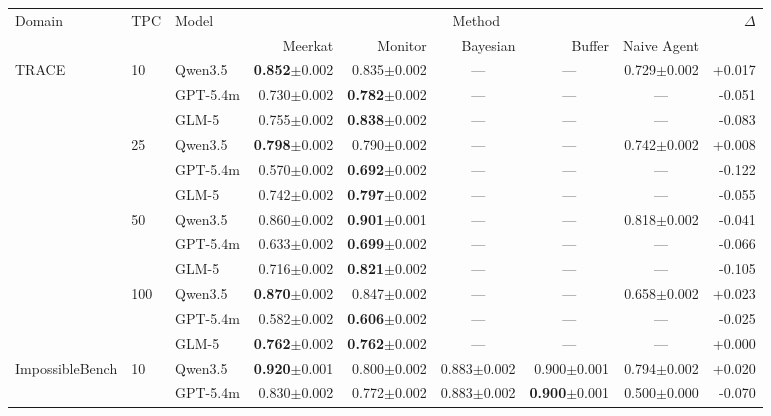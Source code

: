\documentclass{article} %
\newcommand{\res}[2]{#1{\scriptsize$\pm$#2}}
\newcommand{\bestres}[2]{\textbf{#1}{\scriptsize$\pm$#2}}
\newcommand{\na}{\multicolumn{1}{c}{---}}
\begin{document}
\begin{table}[t]
  \centering
  \tiny
  \begin{tabular}{@{}lllrrrrrr@{}}
    \toprule
    \multirow{2}{*}{Domain} & \multirow{2}{*}{TPC} & \multirow{2}{*}{Model}
      & \multicolumn{5}{c}{Method} & \multirow{2}{*}{$\Delta$} \\
    \cmidrule(lr){4-8}
      & & & Meerkat & Monitor & Bayesian & Buffer & Naive Agent & \\
    \midrule
    \multirow{12}{*}{TRACE} & \multirow{3}{*}{10} & Qwen3.5 & \bestres{0.852}{0.002} & \res{0.835}{0.002} & \na & \na & \res{0.729}{0.002} & +0.017 \\
     & & GPT-5.4m & \res{0.730}{0.002} & \bestres{0.782}{0.002} & \na & \na & \na & -0.051 \\
     & & GLM-5 & \res{0.755}{0.002} & \bestres{0.838}{0.002} & \na & \na & \na & -0.083 \\
    \cmidrule(lr){2-9}
     & \multirow{3}{*}{25} & Qwen3.5 & \bestres{0.798}{0.002} & \res{0.790}{0.002} & \na & \na & \res{0.742}{0.002} & +0.008 \\
     & & GPT-5.4m & \res{0.570}{0.002} & \bestres{0.692}{0.002} & \na & \na & \na & -0.122 \\
     & & GLM-5 & \res{0.742}{0.002} & \bestres{0.797}{0.002} & \na & \na & \na & -0.055 \\
    \cmidrule(lr){2-9}
     & \multirow{3}{*}{50} & Qwen3.5 & \res{0.860}{0.002} & \bestres{0.901}{0.001} & \na & \na & \res{0.818}{0.002} & -0.041 \\
     & & GPT-5.4m & \res{0.633}{0.002} & \bestres{0.699}{0.002} & \na & \na & \na & -0.066 \\
     & & GLM-5 & \res{0.716}{0.002} & \bestres{0.821}{0.002} & \na & \na & \na & -0.105 \\
    \cmidrule(lr){2-9}
     & \multirow{3}{*}{100} & Qwen3.5 & \bestres{0.870}{0.002} & \res{0.847}{0.002} & \na & \na & \res{0.658}{0.002} & +0.023 \\
     & & GPT-5.4m & \res{0.582}{0.002} & \bestres{0.606}{0.002} & \na & \na & \na & -0.025 \\
     & & GLM-5 & \bestres{0.762}{0.002} & \bestres{0.762}{0.002} & \na & \na & \na & +0.000 \\
    \midrule
    \multirow{8}{*}{ImpossibleBench} & \multirow{2}{*}{10} & Qwen3.5 & \bestres{0.920}{0.001} & \res{0.800}{0.002} & \res{0.883}{0.002} & \res{0.900}{0.001} & \res{0.794}{0.002} & +0.020 \\
     & & GPT-5.4m & \res{0.830}{0.002} & \res{0.772}{0.002} & \res{0.883}{0.002} & \bestres{0.900}{0.001} & \res{0.500}{0.000} & -0.070 \\

\end{tabular}
\end{table}
\end{document}

